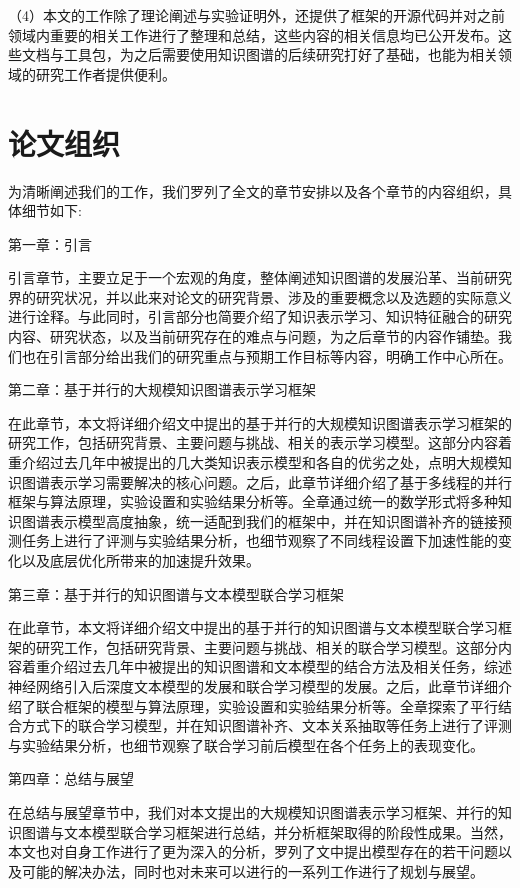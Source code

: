   （4）本文的工作除了理论阐述与实验证明外，还提供了框架的开源代码并对之前领域内重要的相关工作进行了整理和总结，这些内容的相关信息均已公开发布。这些文档与工具包，为之后需要使用知识图谱的后续研究打好了基础，也能为相关领域的研究工作者提供便利。

\section{论文组织}

为清晰阐述我们的工作，我们罗列了全文的章节安排以及各个章节的内容组织，具体细节如下:

第一章：引言

引言章节，主要立足于一个宏观的角度，整体阐述知识图谱的发展沿革、当前研究界的研究状况，并以此来对论文的研究背景、涉及的重要概念以及选题的实际意义进行诠释。与此同时，引言部分也简要介绍了知识表示学习、知识特征融合的研究内容、研究状态，以及当前研究存在的难点与问题，为之后章节的内容作铺垫。我们也在引言部分给出我们的研究重点与预期工作目标等内容，明确工作中心所在。

第二章：基于并行的大规模知识图谱表示学习框架

在此章节，本文将详细介绍文中提出的基于并行的大规模知识图谱表示学习框架的研究工作，包括研究背景、主要问题与挑战、相关的表示学习模型。这部分内容着重介绍过去几年中被提出的几大类知识表示模型和各自的优劣之处，点明大规模知识图谱表示学习需要解决的核心问题。之后，此章节详细介绍了基于多线程的并行框架与算法原理，实验设置和实验结果分析等。全章通过统一的数学形式将多种知识图谱表示模型高度抽象，统一适配到我们的框架中，并在知识图谱补齐的链接预测任务上进行了评测与实验结果分析，也细节观察了不同线程设置下加速性能的变化以及底层优化所带来的加速提升效果。

第三章：基于并行的知识图谱与文本模型联合学习框架

在此章节，本文将详细介绍文中提出的基于并行的知识图谱与文本模型联合学习框架的研究工作，包括研究背景、主要问题与挑战、相关的联合学习模型。这部分内容着重介绍过去几年中被提出的知识图谱和文本模型的结合方法及相关任务，综述神经网络引入后深度文本模型的发展和联合学习模型的发展。之后，此章节详细介绍了联合框架的模型与算法原理，实验设置和实验结果分析等。全章探索了平行结合方式下的联合学习模型，并在知识图谱补齐、文本关系抽取等任务上进行了评测与实验结果分析，也细节观察了联合学习前后模型在各个任务上的表现变化。

第四章：总结与展望

在总结与展望章节中，我们对本文提出的大规模知识图谱表示学习框架、并行的知识图谱与文本模型联合学习框架进行总结，并分析框架取得的阶段性成果。当然，本文也对自身工作进行了更为深入的分析，罗列了文中提出模型存在的若干问题以及可能的解决办法，同时也对未来可以进行的一系列工作进行了规划与展望。

